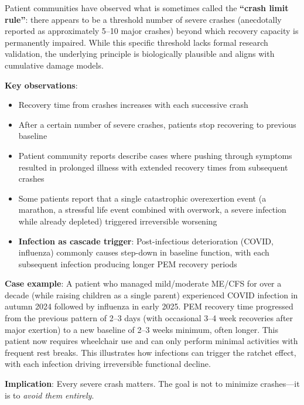 \begin{observation}
\label{warn:crash-limit}
Patient communities have observed what is sometimes called the \textbf{``crash limit rule''}: there appears to be a threshold number of severe crashes (anecdotally reported as approximately 5--10 major crashes) beyond which recovery capacity is permanently impaired. While this specific threshold lacks formal research validation, the underlying principle is biologically plausible and aligns with cumulative damage models.

\textbf{Key observations}:
\begin{itemize}
    \item Recovery time from crashes increases with each successive crash
    \item After a certain number of severe crashes, patients stop recovering to previous baseline
    \item Patient community reports describe cases where pushing through symptoms resulted in prolonged illness with extended recovery times from subsequent crashes
    \item Some patients report that a single catastrophic overexertion event (a marathon, a stressful life event combined with overwork, a severe infection while already depleted) triggered irreversible worsening
    \item \textbf{Infection as cascade trigger}: Post-infectious deterioration (COVID, influenza) commonly causes step-down in baseline function, with each subsequent infection producing longer PEM recovery periods
\end{itemize}

\textbf{Case example}: A patient who managed mild/moderate ME/CFS for over a decade (while raising children as a single parent) experienced COVID infection in autumn 2024 followed by influenza in early 2025. PEM recovery time progressed from the previous pattern of 2--3 days (with occasional 3--4 week recoveries after major exertion) to a new baseline of 2--3 weeks minimum, often longer. This patient now requires wheelchair use and can only perform minimal activities with frequent rest breaks. This illustrates how infections can trigger the ratchet effect, with each infection driving irreversible functional decline.

\textbf{Implication}: Every severe crash matters. The goal is not to minimize crashes---it is to \emph{avoid them entirely}.
\end{observation}

